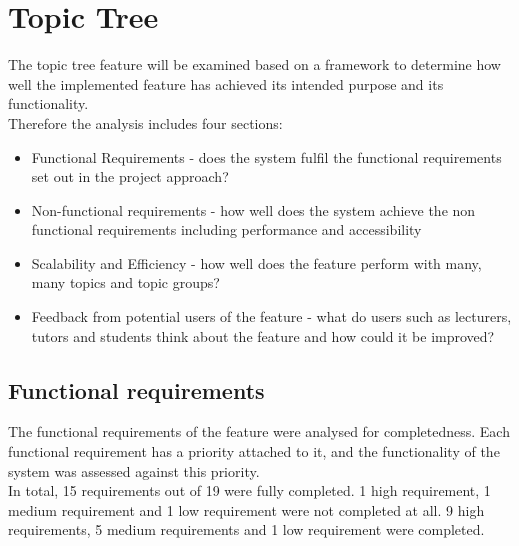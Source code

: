 \section{Topic Tree}

The topic tree feature will be examined based on a framework to determine how well the implemented feature has achieved its intended purpose and its functionality. \\

Therefore the analysis includes four sections:\\
\begin{itemize}
    \item Functional Requirements - does the system fulfil the functional requirements set out in the project approach?
    \item Non-functional requirements - how well does the system achieve the non functional requirements including performance and accessibility
    \item Scalability and Efficiency - how well does the feature perform with many, many topics and topic groups?
    \item Feedback from potential users of the feature - what do users such as lecturers, tutors and students think about the feature and how could it be improved?
\end{itemize}

\subsection{Functional requirements}
The functional requirements of the feature were analysed for completedness. Each functional requirement has a priority attached to it, and the functionality of the system was assessed against this priority. \\

In total, 15 requirements out of 19 were fully completed. 1 high requirement, 1 medium requirement and 1 low requirement were not completed at all. 9 high requirements, 5 medium requirements and 1 low requirement were completed. \\

